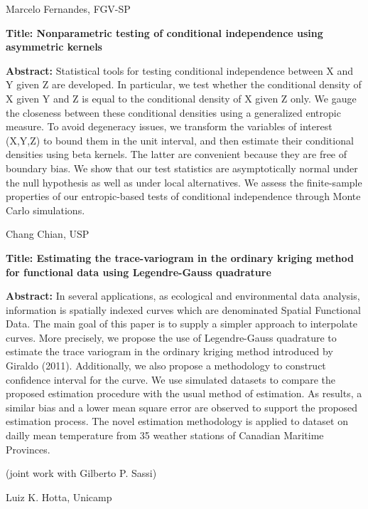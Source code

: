 \documentclass[11pt]{article}
\begin{document}
\newpage

{\large \sc Marcelo Fernandes, FGV-SP}


{\bf Title: Nonparametric testing of conditional independence using
  asymmetric kernels}

{\bf Abstract:} Statistical tools for testing conditional independence
between X and Y given Z are developed. In particular, we test whether
the conditional density of X given Y and Z is equal to the conditional
density of X given Z only. We gauge the closeness between these
conditional densities using a generalized entropic measure. To avoid
degeneracy issues, we transform the variables of interest (X,Y,Z) to
bound them in the unit interval, and then estimate their conditional
densities using beta kernels. The latter are convenient because they
are free of boundary bias. We show that our test statistics are
asymptotically normal under the null hypothesis as well as under local
alternatives. We assess the finite-sample properties of our
entropic-based tests of conditional independence through Monte Carlo
simulations.

\newpage
 
{\large \sc Chang Chian, USP}


{\bf Title: Estimating the trace-variogram in the ordinary kriging
  method for functional data using Legendre-Gauss quadrature}

{\bf Abstract:} In several applications, as ecological and
environmental data analysis, information is spatially indexed curves
which are denominated Spatial Functional Data.  The main goal of this
paper is to supply a simpler approach to interpolate curves. More
precisely, we propose the use of Legendre-Gauss quadrature to estimate
the trace variogram in the ordinary kriging method introduced by
Giraldo (2011). Additionally, we also propose a methodology to
construct confidence interval for the curve.  We use simulated
datasets to compare the proposed estimation procedure with the usual
method of estimation. As results, a similar bias and a lower mean
square error are observed to support the proposed estimation process.
The novel estimation methodology is applied to dataset on dailly mean
temperature from 35 weather stations of Canadian Maritime Provinces.

(joint work with Gilberto P. Sassi)

\newpage

{\large \sc Luiz K. Hotta, Unicamp}
\end{document}
